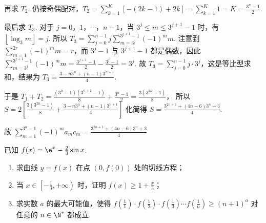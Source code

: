 \documentclass[UTF8,a4paper,oneside,11pt]{ctexbook}
\begin{document}
\begin{solution}
\begin{enumerate}
\begin{enumerate}
再求 \(T_2\). 仍按奇偶配对，\(T_2=\sum_{k=1}^{K}\left[ -\left( 2k-1 \right)+2k \right]=\sum_{k=1}^{K}1=K=\frac{3^n-1}{2}\).

最后求 \(T_3\). 对于 \(j=0\)，\(1\)，\(\cdots\)，\(n-1\)，当 \(3^j\le m\le 3^{j+1}-1\) 时，有 \(\left\lfloor \log_3 m \right\rfloor =j\). 所以 \(T_3=\sum_{j=0}^{n-1}j\sum_{m=3^j}^{3^{j+1}-1}\left( -1 \right)^m m\). 注意到 \(\sum_{m=1}^{2r}\left( -1 \right)^m m=r\)，而 \(3^j-1\) 与 \(3^{j+1}-1\) 都是偶数，因此 \(\sum_{m=3^j}^{3^{j+1}-1}\left( -1 \right)^m m=\frac{3^{j+1}-1}{2}-\frac{3^j-1}{2}=3^j\). 故 \(T_3=\sum_{j=0}^{n-1}j\cdot 3^j\)，这是等比型求和，结果为 \(T_3=\frac{3-n3^n+\left( n-1 \right)3^{n+1}}{4}\).

于是
\(
T_1+T_2=\frac{\left( 3^n-1 \right)\left( 3^{n+1}-1 \right)}{8}+\frac{3^n-1}{2}
=\frac{3\left( 3^{2n}-1 \right)}{8}
\)，
所以
\(
S=2\left[ \frac{3\left( 3^{2n}-1 \right)}{8}+\frac{3-n3^n+\left( n-1 \right)3^{n+1}}{4} \right]
\)
化简得 \(S=\frac{3^{2n+1}+\left( 4n-6 \right)3^n+3}{4}\).

故
\(
\sum_{m=1}^{3^n-1}\left( -1 \right)^m a_m c_m=\frac{3^{2n+1}+\left( 4n-6 \right)3^n+3}{4}
\)
\end{enumerate}
\end{enumerate}
\end{solution}

\begin{problem}
已知 \(f(x)=\e^x-\frac{2}{3}\sin x\).

\begin{enumerate}
\item 求曲线 \(y=f(x)\) 在点 \((0,f(0))\) 处的切线方程；
\item 当 \(x\in \left[ -\frac{1}{3},+\infty \right)\) 时，证明 \(f(x)\ge 1+\frac{x}{3}\)；
\item 求实数 \(a\) 的最大可能值，使得 \(f\left( \frac{1}{1} \right)\cdot f\left( \frac{1}{2} \right)\cdot f\left( \frac{1}{3} \right)\cdots f\left( \frac{1}{n} \right)\ge (n+1)^a\) 对任意的 \(n\in \N^*\) 都成立.
\end{enumerate}
\end{problem}
\end{document}
